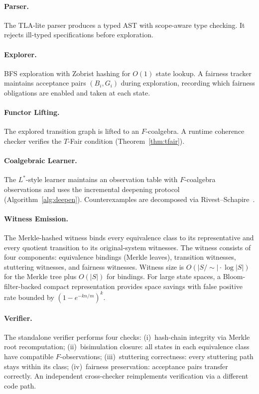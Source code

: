 \documentclass[11pt]{article}
\newcommand{\TFair}{$T$-Fair}
\begin{document}
\paragraph{Parser.}
The TLA-lite parser produces a typed AST with scope-aware type checking.
It rejects ill-typed specifications before exploration.

\paragraph{Explorer.}
BFS exploration with Zobrist hashing for $O(1)$ state lookup.
A fairness tracker maintains acceptance pairs $(B_i, G_i)$ during
exploration, recording which fairness obligations are enabled and taken
at each state.

\paragraph{Functor Lifting.}
The explored transition graph is lifted to an $F$-coalgebra.
A runtime coherence checker verifies the \TFair{} condition
(Theorem~\ref{thm:tfair}).

\paragraph{Coalgebraic Learner.}
The $L^*$-style learner maintains an observation table with $F$-coalgebra
observations and uses the incremental deepening protocol
(Algorithm~\ref{alg:deepen}).
Counterexamples are decomposed via Rivest--Schapire~\cite{RivestS93}.

\paragraph{Witness Emission.}
The Merkle-hashed witness binds every equivalence class to its
representative and every quotient transition to its original-system
witnesses.
The witness consists of four components: equivalence bindings (Merkle
leaves), transition witnesses, stuttering witnesses, and fairness
witnesses.
Witness size is $O(|S/{\sim}| \cdot \log |S|)$ for the Merkle tree plus
$O(|S|)$ for bindings.
For large state spaces, a Bloom-filter-backed compact representation
provides space savings with false positive rate bounded by
$(1 - e^{-kn/m})^k$.

\paragraph{Verifier.}
The standalone verifier performs four checks:
(i)~hash-chain integrity via Merkle root recomputation;
(ii)~bisimulation closure: all states in each equivalence class have
compatible $F$-observations;
(iii)~stuttering correctness: every stuttering path stays within its class;
(iv)~fairness preservation: acceptance pairs transfer correctly.
An independent cross-checker reimplements verification via a different
code path.
\end{document}
